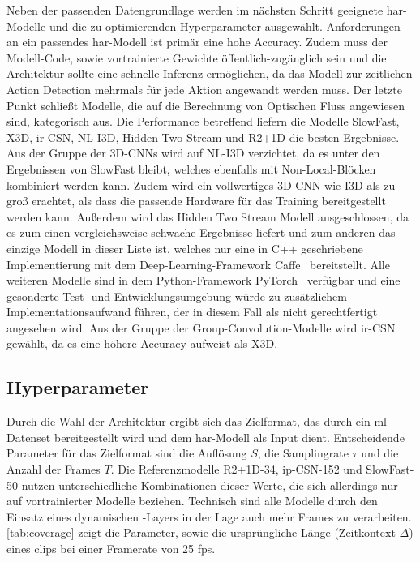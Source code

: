 Neben der passenden Datengrundlage werden im nächsten Schritt geeignete \gls{har}-Modelle und die zu optimierenden Hyperparameter ausgewählt.
Anforderungen an ein passendes \gls{har}-Modell ist primär eine hohe Accuracy.
Zudem muss der Modell-Code, sowie vortrainierte Gewichte öffentlich-zugänglich sein und die Architektur sollte eine schnelle Inferenz ermöglichen, da das Modell zur zeitlichen Action Detection mehrmals für jede Aktion angewandt werden muss.
Der letzte Punkt schließt Modelle, die auf die Berechnung von Optischen Fluss angewiesen sind, kategorisch aus.
Die Performance betreffend liefern die Modelle SlowFast, X3D, ir-CSN, NL-I3D, Hidden-Two-Stream und R2+1D die besten Ergebnisse.
Aus der Gruppe der 3D-CNNs wird auf NL-I3D verzichtet, da es unter den Ergebnissen von SlowFast bleibt, welches ebenfalls mit Non-Local-Blöcken kombiniert werden kann.
Zudem wird ein vollwertiges 3D-CNN wie I3D als zu groß erachtet, als dass die passende Hardware für das Training bereitgestellt werden kann.
Außerdem wird das Hidden Two Stream Modell ausgeschlossen, da es zum einen vergleichsweise schwache Ergebnisse liefert und zum anderen das einzige Modell in dieser Liste ist, welches nur eine in C++ geschriebene Implementierung mit dem Deep-Learning-Framework Caffe~\cite{Jia14} bereitstellt.
Alle weiteren Modelle sind in dem Python-Framework PyTorch~\cite{Paszke19} verfügbar und eine gesonderte Test- und Entwicklungsumgebung würde zu zusätzlichem Implementationsaufwand führen, der in diesem Fall als nicht gerechtfertigt angesehen wird.
Aus der Gruppe der Group-Convolution-Modelle wird ir-CSN gewählt, da es eine höhere Accuracy aufweist als X3D.

\subsection{Hyperparameter}
\label{subsec:hyperparameter}

Durch die Wahl der Architektur ergibt sich das Zielformat, das durch ein \gls{ml}-Datenset bereitgestellt wird und dem \gls{har}-Modell als Input dient.
Entscheidende Parameter für das Zielformat sind die Auflösung $S$, die Samplingrate $\tau$ und die Anzahl der Frames $T$.
Die Referenzmodelle R2+1D-34, ip-CSN-152 und SlowFast-50 nutzen unterschiedliche Kombinationen dieser Werte, die sich allerdings nur auf vortrainierter Modelle beziehen.
Technisch sind alle Modelle durch den Einsatz eines dynamischen \pool-Layers in der Lage auch mehr Frames zu verarbeiten.
\autoref{tab:coverage} zeigt die Parameter, sowie die ursprüngliche Länge (Zeitkontext $\Delta$) eines \glspl{clip} bei einer Framerate von 25 \gls{fps}.

